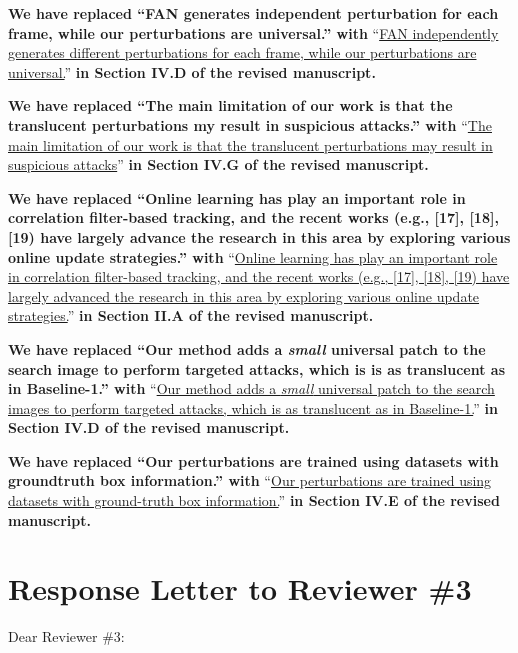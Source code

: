 \documentclass[12pt]{article}
\begin{document}
\textbf{We have replaced ``FAN generates independent perturbation for each frame, while our perturbations are universal.'' with} ``\uline{FAN independently generates different perturbations for each frame, while our perturbations are universal.}'' \textbf{in Section IV.D of the revised manuscript.}

\textbf{We have replaced ``The main limitation of our work is that the translucent perturbations my result in suspicious attacks.'' with} ``\uline{The main limitation of our work is that the translucent perturbations may result in suspicious attacks}'' \textbf{in Section IV.G of the revised manuscript.}

\textbf{We have replaced ``Online learning has play an important role in correlation filter-based tracking, and the recent works (e.g., [17], [18], [19) have largely advance the research in this area by exploring various online update strategies.'' with} ``\uline{Online learning has play an important role in correlation filter-based tracking, and the recent works (e.g., [17], [18], [19) have largely advanced the research in this area by exploring various online update strategies.}'' \textbf{in Section II.A of the revised manuscript.}

\textbf{We have replaced ``Our method adds a \textit{small} universal patch to the search image to perform targeted attacks, which is is as translucent as in Baseline-1.'' with} ``\uline{Our method adds a \textit{small} universal patch to the search images to perform targeted attacks, which is as translucent as in Baseline-1.}'' \textbf{in Section IV.D of the revised manuscript.}

\textbf{We have replaced ``Our perturbations are trained using datasets with groundtruth box information.'' with} ``\uline{Our perturbations are trained using datasets with ground-truth box information.}'' \textbf{in Section IV.E of the revised manuscript.}

\clearpage
\newpage
{\centering\section*{Response Letter to Reviewer \#3}}
\noindent Dear Reviewer \#3:
\end{document}
